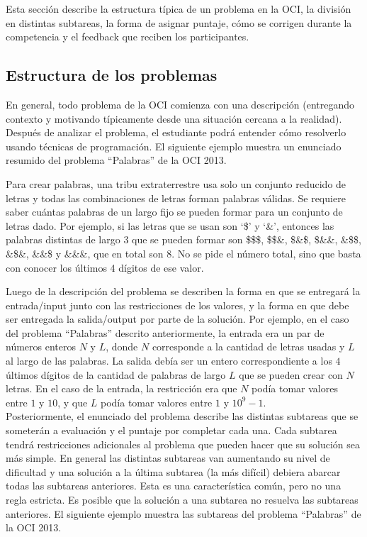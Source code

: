 Esta sección describe la estructura típica de un problema en la OCI, la división en
distintas subtareas, la forma de asignar puntaje, cómo se corrigen durante la
competencia y el feedback que reciben los participantes.

\subsection{Estructura de los problemas}

En general, todo problema de la OCI comienza con una descripción (entregando
contexto y motivando típicamente desde una situación cercana a la realidad).
Después de analizar el problema, el estudiante podrá entender cómo resolverlo
usando técnicas de programación. El siguiente ejemplo muestra un enunciado
resumido del problema ``Palabras'' de la OCI 2013.

\begin{ejemplo}
Para crear palabras, una tribu extraterrestre usa solo un conjunto reducido de
letras y todas las combinaciones de letras forman palabras válidas.
Se requiere saber cuántas palabras de un largo fijo se pueden formar para un
conjunto de letras dado.
Por ejemplo, si las letras que se usan son `\$' y `\&', entonces las palabras
distintas de largo 3 que se pueden formar son \$\$\$, \$\$\&, \$\&\$, \$\&\&,
\&\$\$, \&\$\&, \&\&\$ y \&\&\&, que en total son 8.
No se pide el número total, sino que basta con conocer los últimos 4 dígitos de
ese valor.
\end{ejemplo}

Luego de la descripción del problema se describen la forma en que se entregará la
entrada/input junto con las restricciones de los valores, y la forma en que debe
ser entregada la salida/output por parte de la solución.
Por ejemplo, en el caso del problema ``Palabras'' descrito anteriormente, la
entrada era un par de números enteros $N$ y $L$, donde $N$ corresponde a la
cantidad de letras usadas y $L$ al largo de las palabras.
La salida debía ser un entero correspondiente a los $4$ últimos dígitos de la
cantidad de palabras de largo $L$ que se pueden crear con $N$ letras.
En el caso de la entrada, la restricción era que $N$ podía tomar valores entre
$1$ y $10$, y que $L$ podía tomar valores entre $1$ y $10^9-1$.\\

Posteriormente, el enunciado del problema describe las distintas subtareas que se
someterán a evaluación y el puntaje por completar cada una.
Cada subtarea tendrá restricciones adicionales al problema que pueden hacer que su
solución sea más simple.
En general las distintas subtareas van aumentando su nivel de dificultad y una
solución a la última subtarea (la más difícil) debiera abarcar todas las subtareas
anteriores.
Esta es una característica común, pero no una regla estricta.
Es posible que la solución a una subtarea no resuelva las subtareas anteriores.
El siguiente ejemplo muestra las subtareas del problema ``Palabras'' de la OCI 2013.

